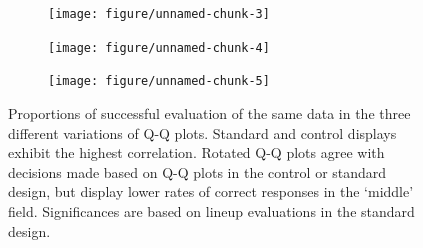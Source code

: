 \documentclass{article}\usepackage[]{graphicx}\usepackage[]{color}
\newenvironment{knitrout}{}{} %
\begin{document}
\begin{figure}
\centering
\begin{subfigure}[b]{.3\textwidth}
\begin{knitrout}
\color{fgcolor}
\texttt{[image: figure/unnamed-chunk-3]} 

\end{knitrout}

\end{subfigure}
\begin{subfigure}[b]{.3\textwidth}
\begin{knitrout}
\color{fgcolor}
\texttt{[image: figure/unnamed-chunk-4]} 

\end{knitrout}

\end{subfigure}
\begin{subfigure}[b]{.3\textwidth}
\begin{knitrout}
\color{fgcolor}
\texttt{[image: figure/unnamed-chunk-5]} 

\end{knitrout}

\end{subfigure}
\caption{\label{fig:compare}Proportions of successful evaluation of the same data in the three different variations of Q-Q plots. Standard and control displays exhibit the highest correlation. Rotated Q-Q plots agree with decisions made based on Q-Q plots in the control or standard design, but display lower rates of correct responses in the `middle' field. Significances are based on lineup evaluations in the standard design. }
\end{figure}
\end{document}
